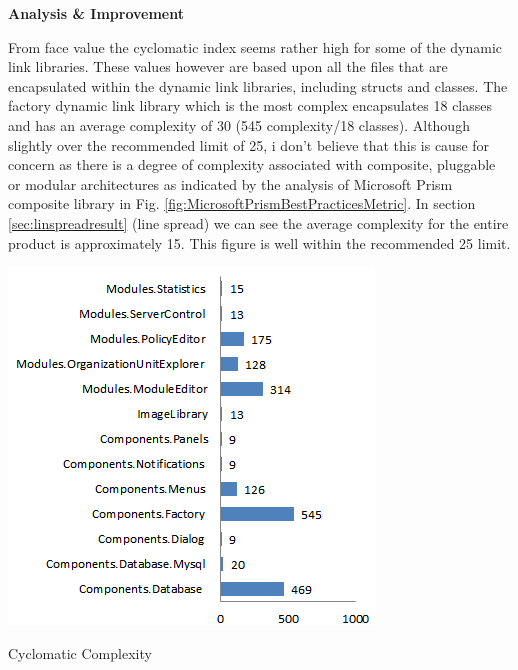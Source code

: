 		\vspace{-9mm}
		\begin{multicols}{2}

			\large{\bfseries{Analysis \& Improvement}}
			\vspace{1mm}

			\normalsize
			{
				From face value the cyclomatic index seems rather high for some of the dynamic link libraries. 
				These values however are based upon all the files that are encapsulated within the dynamic link libraries, 
				including structs and classes.
				\newline
				\newline
				The factory dynamic link library which is the most complex encapsulates 18 classes   
				and has an average complexity of 30 (545 complexity/18 classes).
				\newline
				\newline
				Although slightly over the recommended limit of 25, i don't believe that this is cause for concern as there is a degree 
				of complexity associated with composite, pluggable or modular architectures as indicated by the analysis of Microsoft Prism
				composite library in Fig. \ref{fig:MicrosoftPrismBestPracticesMetric}.
				\newline
				In section \ref{sec:linspreadresult} (line spread) we can see the average complexity for the
				entire product is approximately 15.  This figure is well within the recommended 25 limit. 
				\newline
				\newline
			}				
					
			\begin{figurehere}
				\centering
				\includegraphics[scale=0.9]{pages/chapter4/figures/complex.png}
				\vspace{-5mm}
				\caption{Cyclomatic Complexity}
				\label{fig:CyclomaticComplexity}
			\end{figurehere}
		

\end{multicols}
